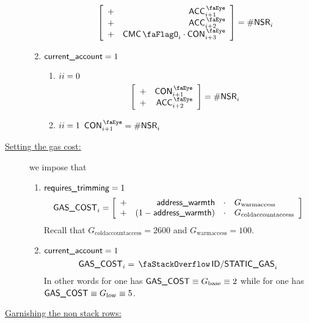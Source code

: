 \begin{description}
\begin{enumerate}
\begin{enumerate}
						\[
							\left[ \begin{array}{cr}
								+ & \peekAccount_{i + 1} \\ 
								+ & \peekAccount_{i + 2} \\ 
								+ & \cmc_{i} \cdot \peekContext_{i + 3} \\ 
							\end{array} \right]
							= \nonStackRows_{i}
						\]
				\end{enumerate}
			\item \If $\textsf{current\_account}   = 1$ \Then
				\begin{enumerate}
					\item \If $\xAhoy_{i} = 0$ \Then
						\[
							\left[ \begin{array}{cr}
								+ & \peekContext_{i + 1} \\ 
								+ & \peekAccount_{i + 2} \\ 
							\end{array} \right]
							= \nonStackRows_{i}
						\]
					\item \If $\xAhoy_{i} = 1$ \Then $\peekContext_{i + 1} = \nonStackRows_{i}$
				\end{enumerate}
		\end{enumerate}
	\item[\underline{Setting the gas cost:}]
		we impose that
		\begin{enumerate}
			\item \If $\textsf{requires\_trimming} = 1$ \Then
				\[
					\textsf{GAS}\textsf{\_COST}_{i}
					=
					\left[ \begin{array}{crcl}
						+ & \textsf{address\_warmth}       & \cdot & G_{\text{warmaccess}}        \\
						+ & (1 - \textsf{address\_warmth}) & \cdot & G_{\text{coldaccountaccess}} \\
					\end{array} \right]
				\]
				\saNote{}
				Recall that
				$G_{\text{coldaccountaccess}} = 2600$ and
				$G_{\text{warmaccess}} = 100$.
			\item \If $\textsf{current\_account}   = 1$ \Then
				\[
					\gasCost_{i} = \stackStaticGas_{i}
				\]
				\saNote{}
				In other words for
				    one has $\textsf{GAS}\textsf{\_COST} \equiv G_{\text{base}} \equiv 2$ while for
				 one has $\textsf{GAS}\textsf{\_COST} \equiv G_{\text{low}}  \equiv 5$.
		\end{enumerate}
	\item[\underline{Garnishing the non stack rows:}]

\end{description}
